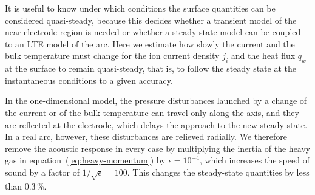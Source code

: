 
It is useful to know under which conditions the surface quantities can be considered quasi-steady, because this decides whether a transient model of the near-electrode region is needed or whether a steady-state model \cite{Almeida2008,Benilov2016,semenov2016numerical} can be coupled to an LTE model of the arc. Here we estimate how slowly the current and the bulk temperature must change for the ion current density \(j_i\) and the heat flux \(q_w\) at the surface to remain quasi-steady, that is, to follow the steady state at the instantaneous conditions to a given accuracy. 



In the one-dimensional model, the pressure disturbances launched by a change of the current or of the bulk temperature can travel only along the axis, and they are reflected at the electrode, which delays the approach to the new steady state. In a real arc, however, these disturbances are relieved radially. We therefore remove the acoustic response in every case by multiplying the inertia of the heavy gas in equation~(\ref{eq:heavy-momentum}) by \(\epsilon=10^{-4}\), which increases the speed of sound by a factor of \(1/\sqrt{\epsilon}=100\). This changes the steady-state quantities by less than 0.3\,\%.

